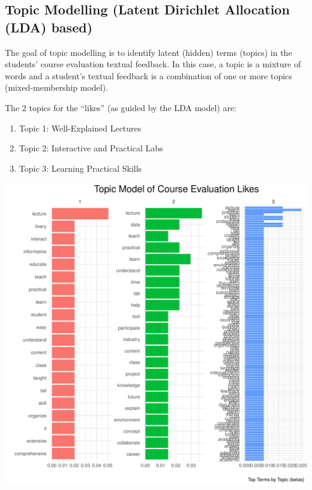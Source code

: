 \documentclass[
]{article}
\begin{document}
\newpage

\subsection{Topic Modelling (Latent Dirichlet Allocation (LDA)
based)}\label{topic-modelling-latent-dirichlet-allocation-lda-based}

The goal of topic modelling is to identify latent (hidden) terms
(topics) in the students' course evaluation textual feedback. In this
case, a topic is a mixture of words and a student's textual feedback is
a combination of one or more topics (mixed-membership model).

The 2 topics for the ``likes'' (as guided by the LDA model) are:

\begin{enumerate}
\def\labelenumi{\arabic{enumi}.}
\item
  Topic 1: Well-Explained Lectures
\item
  Topic 2: Interactive and Practical Labs
\item
  Topic 3: Learning Practical Skills
\end{enumerate}

\includegraphics{10.b.BBT4206-End-SemesterCourseEvaluation-20230821-20231128-BI2-BBIT4-2_files/figure-latex/visualizations_for_likes_topic_modelling-1.pdf}
\end{document}

